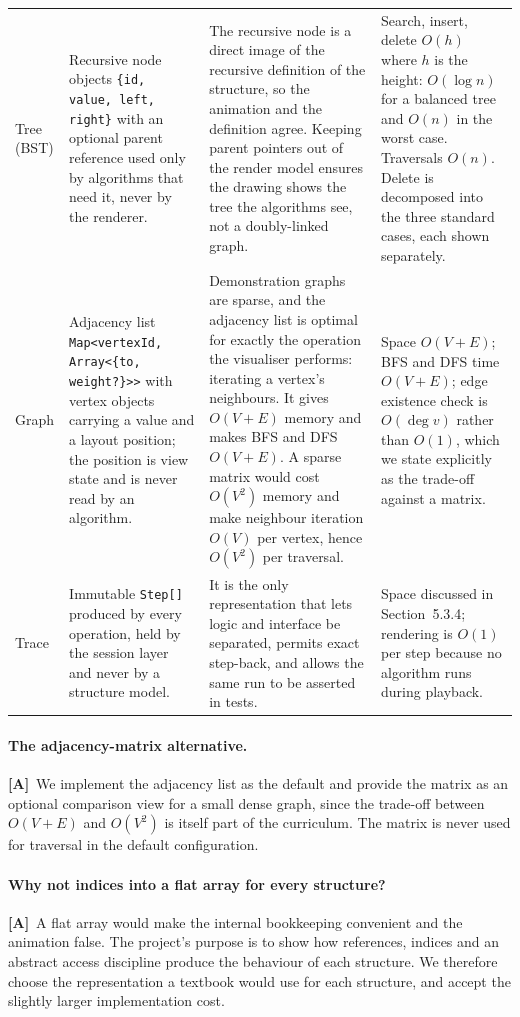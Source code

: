 \documentclass[11pt,a4paper]{article}
\newcommand{\A}{\textcolor{asmc}{\textbf{[A]}}}     %
\newcommand{\ct}[1]{\texttt{#1}}
\begin{document}
{\begin{longtable}{@{}L{1.9cm}L{4.6cm}L{4.3cm}L{4.2cm}@{}}
Tree (BST) & Recursive node objects \ct{\{id, value, left, right\}} with an optional
parent reference used only by algorithms that need it, never by the renderer. &
The recursive node is a direct image of the recursive definition of the structure, so the
animation and the definition agree. Keeping parent pointers out of the render model ensures
the drawing shows the tree the algorithms see, not a doubly-linked graph. &
Search, insert, delete $O(h)$ where $h$ is the height: $O(\log n)$ for a balanced tree and
$O(n)$ in the worst case. Traversals $O(n)$. Delete is decomposed into the three standard
cases, each shown separately. \\

Graph & Adjacency list \ct{Map<vertexId, Array<\{to, weight?\}>>} with vertex objects
carrying a value and a layout position; the position is view state and is never read by an
algorithm. &
Demonstration graphs are sparse, and the adjacency list is optimal for exactly the operation
the visualiser performs: iterating a vertex's neighbours. It gives $O(V+E)$ memory and makes
BFS and DFS $O(V+E)$. A sparse matrix would cost $O(V^2)$ memory and make neighbour
iteration $O(V)$ per vertex, hence $O(V^2)$ per traversal. &
Space $O(V+E)$; BFS and DFS time $O(V+E)$; edge existence check is $O(\deg v)$ rather than
$O(1)$, which we state explicitly as the trade-off against a matrix. \\

Trace & Immutable \ct{Step[]} produced by every operation, held by the session layer and
never by a structure model. &
It is the only representation that lets logic and interface be separated, permits exact
step-back, and allows the same run to be asserted in tests. &
Space discussed in Section~5.3.4; rendering is $O(1)$ per step because no algorithm runs
during playback. \\
\end{longtable}
}

\paragraph{The adjacency-matrix alternative.} \A\ We implement the adjacency list as the
default and provide the matrix as an optional comparison view for a small dense graph, since
the trade-off between $O(V+E)$ and $O(V^2)$ is itself part of the curriculum. The matrix is
never used for traversal in the default configuration.

\paragraph{Why not indices into a flat array for every structure?} \A\ A flat array would
make the internal bookkeeping convenient and the animation false. The project's purpose is
to show how references, indices and an abstract access discipline produce the behaviour of
each structure. We therefore choose the representation a textbook would use for each
structure, and accept the slightly larger implementation cost.
\end{document}
